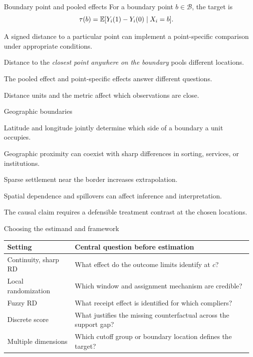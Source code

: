 \begin{frame}{Boundary point and pooled effects}
For a boundary point $b\in\mathcal B$, the target is
\[
\tau(b)=\mathbb{E}[Y_i(1)-Y_i(0)\mid X_i=b].
\]
\begin{items}
\item A signed distance to a particular point can implement a point-specific comparison under appropriate conditions.
\item Distance to the \emph{closest point anywhere on the boundary} pools different locations.
\item The pooled effect and point-specific effects answer different questions.
\item Distance units and the metric affect which observations are close.
\end{items}
\end{frame}

\begin{frame}{Geographic boundaries}
\begin{items}
\item Latitude and longitude jointly determine which side of a boundary a unit occupies.
\item Geographic proximity can coexist with sharp differences in sorting, services, or institutions.
\item Sparse settlement near the border increases extrapolation.
\item Spatial dependence and spillovers can affect inference and interpretation.
\item The causal claim requires a defensible treatment contrast at the chosen locations.
\end{items}
\end{frame}

\begin{frame}{Choosing the estimand and framework}
\small\renewcommand{\arraystretch}{1.45}
\begin{tabular}{@{}p{.26\linewidth}p{.64\linewidth}@{}}\toprule
Setting & Central question before estimation\\\midrule
Continuity, sharp RD & What effect do the outcome limits identify at $c$?\\
Local randomization & Which window and assignment mechanism are credible?\\
Fuzzy RD & What receipt effect is identified for which compliers?\\
Discrete score & What justifies the missing counterfactual across the support gap?\\
Multiple dimensions & Which cutoff group or boundary location defines the target?\\\bottomrule
\end{tabular}
\end{frame}
